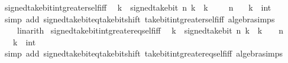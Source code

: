 \begin{isabellebody}
\endisatagproof
{\isafoldproof}%
%
\isadelimproof
\isanewline
%
\endisadelimproof
\isanewline
{}\isamarkupfalse%
\ signed{\isacharunderscore}{\kern0pt}take{\isacharunderscore}{\kern0pt}bit{\isacharunderscore}{\kern0pt}int{\isacharunderscore}{\kern0pt}greater{\isacharunderscore}{\kern0pt}self{\isacharunderscore}{\kern0pt}iff{\isacharcolon}{\kern0pt}\isanewline
\ \ {\isacartoucheopen}k\ {\isacharless}{\kern0pt}\ signed{\isacharunderscore}{\kern0pt}take{\isacharunderscore}{\kern0pt}bit\ n\ k\ {\isasymlongleftrightarrow}\ k\ {\isacharless}{\kern0pt}\ {\isacharminus}{\kern0pt}\ {\isacharparenleft}{\kern0pt}{}\ {\isacharcircum}{\kern0pt}\ n{\isacharparenright}{\kern0pt}{\isacartoucheclose}\isanewline
\ \ \ k\ {\isacharcolon}{\kern0pt}{\isacharcolon}{\kern0pt}\ int\isanewline
%
\isadelimproof
\ \ %
\endisadelimproof
%
\isatagproof
{}\isamarkupfalse%
\ {\isacharparenleft}{\kern0pt}simp\ add{\isacharcolon}{\kern0pt}\ signed{\isacharunderscore}{\kern0pt}take{\isacharunderscore}{\kern0pt}bit{\isacharunderscore}{\kern0pt}eq{\isacharunderscore}{\kern0pt}take{\isacharunderscore}{\kern0pt}bit{\isacharunderscore}{\kern0pt}shift\ take{\isacharunderscore}{\kern0pt}bit{\isacharunderscore}{\kern0pt}int{\isacharunderscore}{\kern0pt}greater{\isacharunderscore}{\kern0pt}self{\isacharunderscore}{\kern0pt}iff\ algebra{\isacharunderscore}{\kern0pt}simps{\isacharparenright}{\kern0pt}\isanewline
\ \ \ \ linarith%
\endisatagproof
{\isafoldproof}%
%
\isadelimproof
\isanewline
%
\endisadelimproof
\isanewline
{}\isamarkupfalse%
\ signed{\isacharunderscore}{\kern0pt}take{\isacharunderscore}{\kern0pt}bit{\isacharunderscore}{\kern0pt}int{\isacharunderscore}{\kern0pt}greater{\isacharunderscore}{\kern0pt}eq{\isacharunderscore}{\kern0pt}self{\isacharunderscore}{\kern0pt}iff{\isacharcolon}{\kern0pt}\isanewline
\ \ {\isacartoucheopen}k\ {\isasymle}\ signed{\isacharunderscore}{\kern0pt}take{\isacharunderscore}{\kern0pt}bit\ n\ k\ {\isasymlongleftrightarrow}\ k\ {\isacharless}{\kern0pt}\ {}\ {\isacharcircum}{\kern0pt}\ n{\isacartoucheclose}\isanewline
\ \ \ k\ {\isacharcolon}{\kern0pt}{\isacharcolon}{\kern0pt}\ int\isanewline
%
\isadelimproof
\ \ %
\endisadelimproof
%
\isatagproof
{}\isamarkupfalse%
\ {\isacharparenleft}{\kern0pt}simp\ add{\isacharcolon}{\kern0pt}\ signed{\isacharunderscore}{\kern0pt}take{\isacharunderscore}{\kern0pt}bit{\isacharunderscore}{\kern0pt}eq{\isacharunderscore}{\kern0pt}take{\isacharunderscore}{\kern0pt}bit{\isacharunderscore}{\kern0pt}shift\ take{\isacharunderscore}{\kern0pt}bit{\isacharunderscore}{\kern0pt}int{\isacharunderscore}{\kern0pt}greater{\isacharunderscore}{\kern0pt}eq{\isacharunderscore}{\kern0pt}self{\isacharunderscore}{\kern0pt}iff\ algebra{\isacharunderscore}{\kern0pt}simps{\isacharparenright}{\kern0pt}%

\end{isabellebody}

